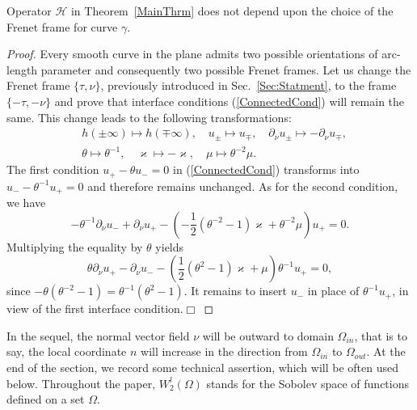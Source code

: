 \documentclass[graybox]{svmult}
\renewcommand{\kappa}{\varkappa}
\newcommand{\eqref}[1]{(\ref{#1})}
\begin{document}
\begin{proposition}\label{PropInvarianceOfCnds}
  Operator $\mathcal{H}$ in Theorem~\ref{MainThrm} does not depend upon the choice of the Frenet frame for curve $\gamma$.
\end{proposition}
\begin{proof}
  Every smooth curve in the plane admits two possible orientations of arc-length parameter and consequently two possible  Frenet frames. Let us change the Frenet frame $\{\tau, \nu\}$, previously introduced in Sec.~\ref{Sec:Statment}, to the frame $\{-\tau, -\nu\}$ and prove that
interface conditions \eqref{ConnectedCond} will remain the same. This change leads to the following transformations:
\begin{eqnarray}\nonumber
&h(\pm\infty)\mapsto h(\mp\infty), \quad u_\pm\mapsto u_\mp, \quad \partial_\nu u_\pm \mapsto -\partial_\nu u_\mp,\\\nonumber
& \theta\mapsto \theta^{-1}, \quad \kappa\mapsto -\kappa,\quad \mu\mapsto \theta^{-2}\mu.
\end{eqnarray}
The first condition $u_+-\theta u_-=0$ in \eqref{ConnectedCond} transforms into $u_--\theta^{-1} u_+=0$ and therefore remains unchanged. As for the second condition, we have
$$
 -\theta^{-1}\partial_\nu u_-+\partial_\nu u_+
-\left(-\textstyle\frac{1}{2 }(\theta^{-2}-1)\kappa+\theta^{-2}\mu\right) u_+=0.
$$
Multiplying the equality by $\theta$  yields
$$
\theta\partial_\nu u_+-\partial_\nu u_-
-\left(\textstyle\frac{1}{2 }(\theta^{2}-1)\kappa+\mu\right) \theta^{-1} u_+=0,
$$
since $-\theta(\theta^{-2}-1)=\theta^{-1}(\theta^{2}-1)$. It remains to insert $u_-$ in place of $\theta^{-1} u_+$, in view of the first interface condition.\hfill$\Box$
\end{proof}

In the sequel, the normal vector field $\nu$ will be outward to domain $\Omega_{in}$, that is to say, the local coordinate $n$ will increase in the direction from $\Omega_{in}$ to $\Omega_{out}$.
At the end of the section,  we record some technical assertion, which  will be often used below.
Throughout the paper, $W_2^l(\Omega)$ stands for the Sobolev space of functions defined on a set $\Omega$.
\end{document}
